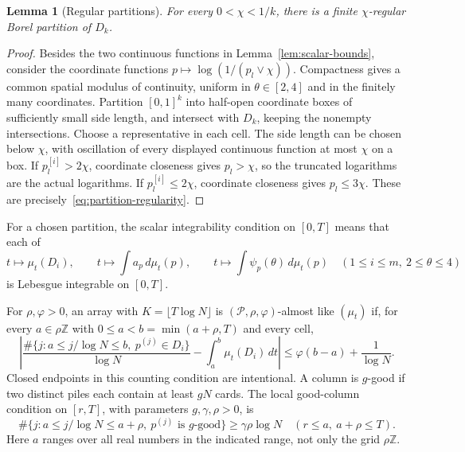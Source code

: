 \documentclass[11pt]{article}
\numberwithin{equation}{section}
\newtheorem{lemma}[theorem]{Lemma}
\theoremstyle{definition}
\theoremstyle{remark}
\newcommand{\1}{\mathbf 1}
\begin{document}
\begin{lemma}[Regular partitions]%
\label{lem:regular-partition}
For every $0<\chi<1/k$, there is a finite $\chi$-regular Borel
partition of $D_k$.
\end{lemma}

\begin{proof}
Besides the two continuous functions in Lemma~\ref{lem:scalar-bounds},
consider the coordinate functions
$p\mapsto\log(1/(p_l\vee\chi))$. Compactness gives a common spatial
modulus of continuity, uniform in $\theta\in[2,4]$ and in the finitely
many coordinates. Partition $[0,1]^k$ into half-open coordinate boxes
of sufficiently small side length, and intersect with $D_k$, keeping
the nonempty intersections. Choose a representative in each cell.
The side length can be chosen below $\chi$, with oscillation of every
displayed continuous function at most $\chi$ on a box. If
$p^{[i]}_l>2\chi$, coordinate closeness gives $p_l>\chi$, so the
truncated logarithms are the actual logarithms. If
$p^{[i]}_l\le2\chi$, coordinate closeness gives $p_l\le3\chi$.
These are precisely~\eqref{eq:partition-regularity}.
\end{proof}

For a chosen partition, the scalar integrability condition on $[0,T]$
means that each of
\begin{equation}%
\label{eq:scalar-integrability}
 t\longmapsto\mu_t(D_i),\qquad
 t\longmapsto\int a_p\,d\mu_t(p),\qquad
 t\longmapsto\int\psi_p(\theta)\,d\mu_t(p)
 \quad(1\le i\le m,\ 2\le\theta\le4)
\end{equation}
is Lebesgue integrable on $[0,T]$.

For $\rho,\varphi>0$, an array with $K=\lfloor T\log N\rfloor$ is
$(\mathcal P,\rho,\varphi)$-almost like $(\mu_t)$ if, for every
$a\in\rho\mathbb Z$ with $0\le a<b=\min(a+\rho,T)$ and every cell,
\begin{equation}%
\label{eq:almost-like}
 \left|\frac{\#\{j:a\le j/\log N\le b,\ p^{(j)}\in D_i\}}{\log N}
       -\int_a^b\mu_t(D_i)\,dt\right|
 \le\varphi(b-a)+\frac1{\log N}.
\end{equation}
Closed endpoints in this counting condition are intentional. A column
is $g$-good if two distinct piles each contain at least $gN$ cards.
The local good-column condition on $[r,T]$, with parameters
$g,\gamma,\rho>0$, is
\begin{equation}%
\label{eq:local-good}
 \#\{j:a\le j/\log N\le a+\rho,\ p^{(j)}\text{ is }g\text{-good}\}
 \ge\gamma\rho\log N
 \quad(r\le a,\ a+\rho\le T).
\end{equation}
Here $a$ ranges over all real numbers in the indicated range, not only
the grid $\rho\mathbb Z$.
\end{document}
